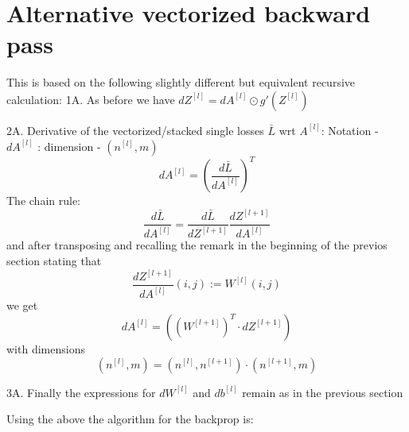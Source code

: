 \documentclass[10pt,a4paper]{article}
\begin{document}
  

\section{Alternative vectorized backward pass}
\label{sec:back1}
This is based on the following slightly different but equivalent recursive calculation:
1A. As before we have $ dZ^{[l]} =   dA^{[l]} \odot g'(Z^{[l]})   $

2A.  Derivative of the vectorized/stacked  single losses $\bar L$ wrt $A^{[l]}$: Notation - $dA^{[l]}$ : dimension - $(n^{[l]}, m) $   
\[dA^{[l]} = \left (\frac{d\bar L }{ d A^{[l]}} \right)^T \]
The chain rule:
\[   \frac{d\bar L }{ d A^{[l]}} = \frac{d\bar L }{ d Z^{[l+1]}} \frac{d Z^{[l+1]} }{ d A^{[l]}}  \]
and after transposing  and recalling the remark in the beginning of the previos section stating that 
\[ \frac{d Z^{[l+1]} }{ d A^{[l]}}(i,j) := W^{[l]}(i,j)  \] 
we get 
\[  dA^{[l]}  =  ( (W^{[l+1]})^T \cdot dZ^{[l+1]} )     \]
with dimensions 
\[ (n^{[l]},m) =  (n^{[l]},n^{[l+1]}) \cdot  (n^{[l+1]},m)  \]

3A. Finally the expressions for $d W^{[l]} $ and $d b^{[l]}$ remain as in the previous section


Using the above the algorithm for the backprop is: 
\end{document}
